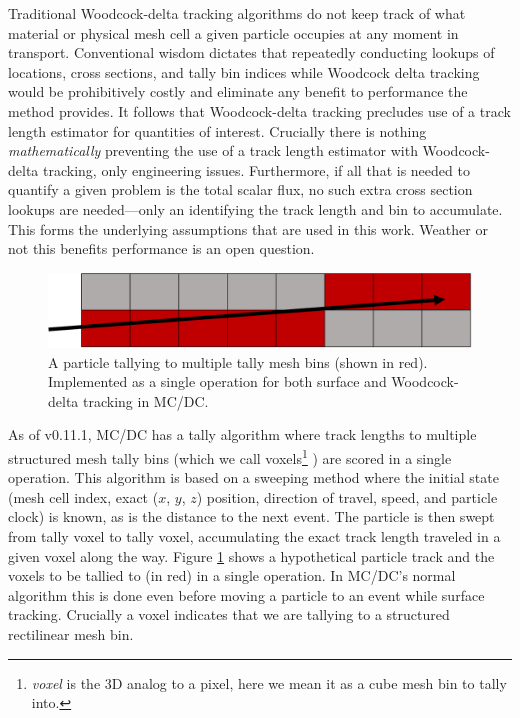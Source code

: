 Traditional Woodcock-delta tracking algorithms do not keep track of what material or physical mesh cell a given particle occupies at any moment in transport.
Conventional wisdom dictates that repeatedly conducting lookups of locations, cross sections, and tally bin indices while Woodcock delta tracking would be prohibitively costly and eliminate any benefit to performance the method provides.
It follows that Woodcock-delta tracking precludes use of a track length estimator for quantities of interest.
Crucially there is nothing \textit{mathematically} preventing the use of a track length estimator with Woodcock-delta tracking, only engineering issues.
Furthermore, if all that is needed to quantify a given problem is the total scalar flux, no such extra cross section lookups are needed---only an identifying the track length and bin to accumulate.
This forms the underlying assumptions that are used in this work.
Weather or not this benefits performance is an open question.

\begin{figure}[!htb]
  \centering
  \includegraphics[width=\textwidth]{figures/delta_figs/tally_ray.pdf}
  \caption{A particle tallying to multiple tally mesh bins (shown in red). Implemented as a single operation for both surface and Woodcock-delta tracking in MC/DC.}
  \label{fig:tally_ray}
\end{figure}

As of v0.11.1, MC/DC \cite{morgan_monte_2024} has a tally algorithm where track lengths to multiple structured mesh tally bins (which we call voxels\footnote{\textit{voxel} is the 3D analog to a pixel, here we mean it as a cube mesh bin to tally into.}
) are scored in a single operation.
This algorithm is based on a sweeping method where the initial state (mesh cell index, exact ($x$, $y$, $z$) position, direction of travel, speed, and particle clock) is known, as is the distance to the next event.
The particle is then swept from tally voxel to tally voxel, accumulating the exact track length traveled in a given voxel along the way.
Figure \ref{fig:tally_ray} shows a hypothetical particle track and the voxels to be tallied to (in red) in a single operation.
In MC/DC's normal algorithm this is done even before moving a particle to an event while surface tracking.
Crucially a voxel indicates that we are tallying to a structured rectilinear mesh bin.

